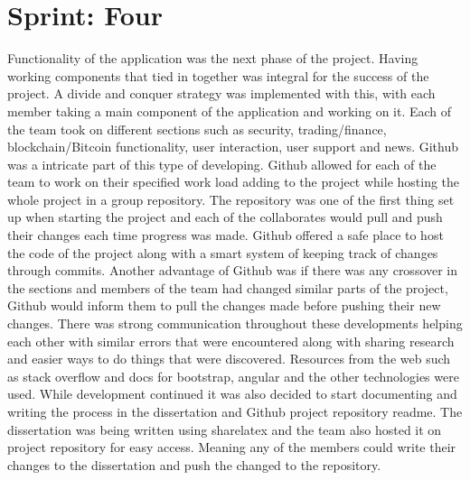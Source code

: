 \section{Sprint: Four}
Functionality of the application was the next phase of the project. Having working components that tied in together was integral for the success of the project. A divide and conquer strategy was implemented with this, with each member taking a main component of the application and working on it. Each of the team took on different sections such as security, trading/finance, blockchain/Bitcoin functionality, user interaction, user support and news. Github was a intricate part of this type of developing. Github allowed for each of the team to work on their specified work load adding to the project while hosting the whole project in a group repository. The repository was one of the first thing set up when starting the project and each of the collaborates would pull and push their changes each time progress was made. Github offered a safe place to host the code of the project along with a smart system of keeping track of changes through commits. Another advantage of Github was if there was any crossover in the sections and members of the team had changed similar parts of the project, Github would inform them to pull the changes made before pushing their new changes. There was strong communication throughout these developments helping each other with similar errors that were encountered along with sharing research and easier ways to do things that were discovered. Resources from the web such as stack overflow and docs for bootstrap, angular and the other technologies were used. While development continued it was also decided to start documenting and writing the process in the dissertation and Github project repository readme. The dissertation was being written using sharelatex and the team also hosted it on project repository for easy access. Meaning any of the members could write their changes to the dissertation and push the changed to the repository.
